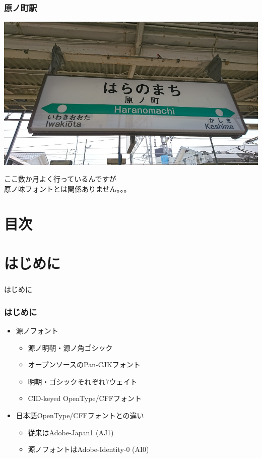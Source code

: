 \begin{frame}\frametitle{原ノ町駅}

  \begin{center}
    \includegraphics[width=0.7\linewidth]{haranomachi.jpg}
  \end{center}

  \footnotesize
  ここ数か月よく行っているんですが\\
  原ノ味フォントとは関係ありません。。。
\end{frame}


\section*{目次}
\begin{frame}\frametitle{}\tiny\setlength{\columnseprule}{1pt}
  \begin{multicols}{2}%
    \tableofcontents
  \end{multicols}
\end{frame}

\section{はじめに}
\begin{frame}\frametitle{}
  \centering
  はじめに
\end{frame}

\begin{frame}\frametitle{はじめに}
  \begin{itemize}
  \item 源ノフォント
    \begin{itemize}
    \item 源ノ明朝・源ノ角ゴシック
    \item オープンソースのPan-CJKフォント
    \item 明朝・ゴシックそれぞれ7ウェイト
    \item CID-keyed OpenType/CFFフォント
    \end{itemize}

    \pause
  \item 日本語OpenType/CFFフォントとの違い
    \begin{itemize}
    \item 従来はAdobe-Japan1 (AJ1)
    \item 源ノフォントはAdobe-Identity-0 (AI0)
    \end{itemize}
  \end{itemize}
\end{frame}

